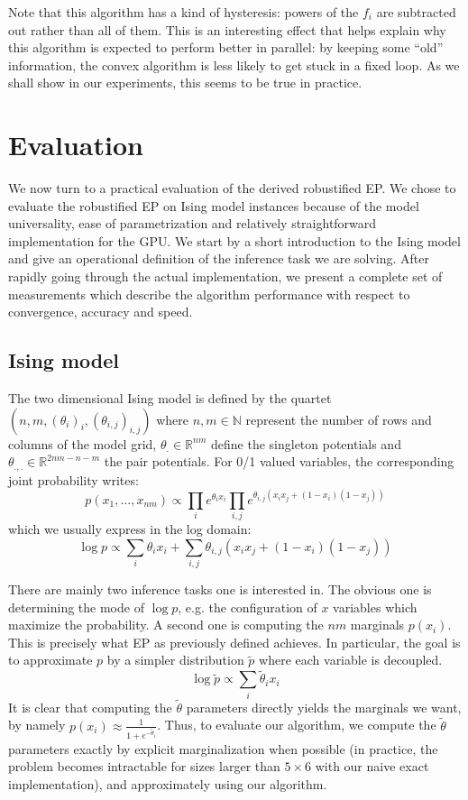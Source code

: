 \documentclass[times, 10pt,twocolumn]{article}
\begin{document}
Note that this algorithm has a kind of hysteresis: powers of the
$f_i$ are subtracted out rather than all of them. This is an
interesting effect that helps explain why this algorithm is
expected to perform better in parallel: by keeping some ``old''
information, the convex algorithm is less likely to get stuck
in a fixed loop. As we shall show in our experiments, this seems to
be true in practice.

\section{Evaluation}
We now turn to a practical evaluation of the derived robustified EP. We chose to evaluate the robustified EP on Ising model instances because of the model universality, ease of parametrization and relatively straightforward implementation for the GPU. We start by a short introduction to the Ising model and give an operational definition of the inference task we are solving. After rapidly going through the actual implementation, we present a complete set of measurements which describe the algorithm performance with respect to convergence, accuracy and speed.

\subsection{Ising model}
The two dimensional Ising model is defined by the quartet $(n, m, (\theta_i)_i, (\theta_{i,j})_{i,j})$ where $n, m \in \mathbb{N}$ represent the number of rows and columns of the model grid, $\theta_. \in \mathbb{R}^{nm}$ define the singleton potentials and $\theta_{.,.} \in \mathbb{R}^{2nm-n-m}$ the pair potentials. For 0/1 valued variables, the corresponding joint probability writes:
\[
	p(x_1,\dots,x_{nm}) \propto \prod_i e^{\theta_i x_i} \prod_{i,j} e^{\theta_{i,j} (x_i x_j + (1-x_i)(1-x_j))}
\]
which we usually express in the log domain:
\[
	\log p \propto \sum_i \theta_i x_i + \sum_{i,j} \theta_{i,j} (x_i x_j + (1-x_i)(1-x_j))
\]

There are mainly two inference tasks one is interested in. The obvious one is determining the mode of $\log p$, e.g. the configuration of $x$ variables which maximize the probability. A second one is computing the $nm$ marginals $p(x_i)$. This is precisely what EP as previously defined achieves. In particular, the goal is to approximate $p$ by a simpler distribution $\tilde p$ where each variable is decoupled. 
\[
	\log \tilde p \propto \sum_i \tilde \theta_i x_i
\]
It is clear that computing the $\tilde \theta$ parameters directly yields the marginals we want, by namely $p(x_i) \approx \frac{1}{1+e^{-\tilde \theta_i}}$. Thus, to evaluate our algorithm, we compute the $\tilde \theta$ parameters exactly by explicit marginalization when possible (in practice, the problem becomes intractable for sizes larger than $5 \times 6$ with our naive exact implementation), and approximately using our algorithm.
\end{document}
